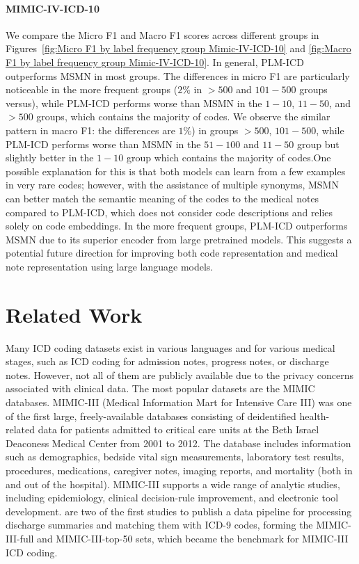 \documentclass[11pt]{article}
\begin{document}
\paragraph{MIMIC-IV-ICD-10}
We compare the Micro F1 and Macro F1 scores across different groups in Figures~\ref{fig:Micro F1 by label frequency group Mimic-IV-ICD-10} and \ref{fig:Macro F1 by label frequency group Mimic-IV-ICD-10}. In general, PLM-ICD outperforms MSMN in most groups. The differences in micro F1 are particularly noticeable in the more frequent groups ($2\%$ in $>500$ and $101-500$ groups versus), while PLM-ICD performs worse than MSMN in the $1-10$, $11-50$, and $>500$ groups, which contains the majority of codes. We observe the similar pattern in macro F1: the differences are $1\%$) in groups $>500$, $101-500$, while PLM-ICD performs worse than MSMN in the $51-100$ and $11-50$ group but slightly better in the $1-10$ group which contains the majority of codes.One possible explanation for this is that both models can learn from a few examples in very rare codes; however, with the assistance of multiple synonyms, MSMN can better match the semantic meaning of the codes to the medical notes compared to PLM-ICD, which does not consider code descriptions and relies solely on code embeddings. In the more frequent groups, PLM-ICD outperforms MSMN due to its superior encoder from large pretrained models. This suggests a potential future direction for improving both code representation and medical note representation using large language models.

\section{Related Work}

Many ICD coding datasets exist in various languages and for various medical stages, such as ICD coding for admission notes, progress notes, or discharge notes. However, not all of them are publicly available due to the privacy concerns associated with clinical data. The most popular datasets are the MIMIC databases. MIMIC-III (Medical Information Mart for Intensive Care III) was one of the first large, freely-available databases consisting of deidentified health-related data for patients admitted to critical care units at the Beth Israel Deaconess Medical Center from 2001 to 2012. The database includes information such as demographics, bedside vital sign measurements, laboratory test results, procedures, medications, caregiver notes, imaging reports, and mortality (both in and out of the hospital). MIMIC-III supports a wide range of analytic studies, including epidemiology, clinical decision-rule improvement, and electronic tool development. \citep{mullenbach-etal-2018-explainable, shi-et-al-2027-automated-icd} are two of the first studies to publish a data pipeline for processing discharge summaries and matching them with ICD-9 codes, forming the MIMIC-III-full and MIMIC-III-top-50 sets, which became the benchmark for MIMIC-III ICD coding.
\end{document}
